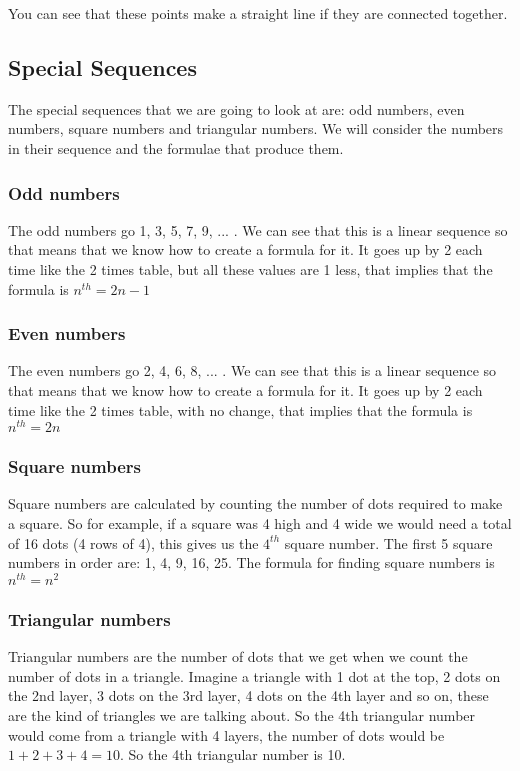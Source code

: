 You can see that these points make a straight line if they are connected together.
\subsection{Special Sequences}
The special sequences that we are going to look at are: odd numbers, even numbers, square numbers and triangular numbers.  We will consider the numbers in their sequence and the formulae that produce them.

\subsubsection{Odd numbers}
The odd numbers go 1, 3, 5, 7, 9, ... . We can see that this is a linear sequence so that means that we know how to create a formula for it.  It goes up by 2 each time like the 2 times table, but all these values are 1 less, that implies that the formula is $n^{th}=2n-1$

\subsubsection{Even numbers}
The even numbers go 2, 4, 6, 8, ... . We can see that this is a linear sequence so that means that we know how to create a formula for it.  It goes up by 2 each time like the 2 times table, with no change, that implies that the formula is $n^{th}=2n$

\subsubsection{Square numbers}
Square numbers are calculated by counting the number of dots required to make a square.  So for example, if a square was 4 high and 4 wide we would need a total of 16 dots (4 rows of 4), this gives us the $4^{th}$ square number.  The first 5 square numbers in order are: 1, 4, 9, 16, 25.  The formula for finding square numbers is $n^{th}=n^2$

\subsubsection{Triangular numbers}
Triangular numbers are the number of dots that we get when we count the number of dots in a triangle.  Imagine a triangle with 1 dot at the top, 2 dots on the 2nd layer, 3 dots on the 3rd layer, 4 dots on the 4th layer and so on, these are the kind of triangles we are talking about.  So the 4th triangular number would come from a triangle with 4 layers, the number of dots would be $1+2+3+4=10$.  So the 4th triangular number is 10.

